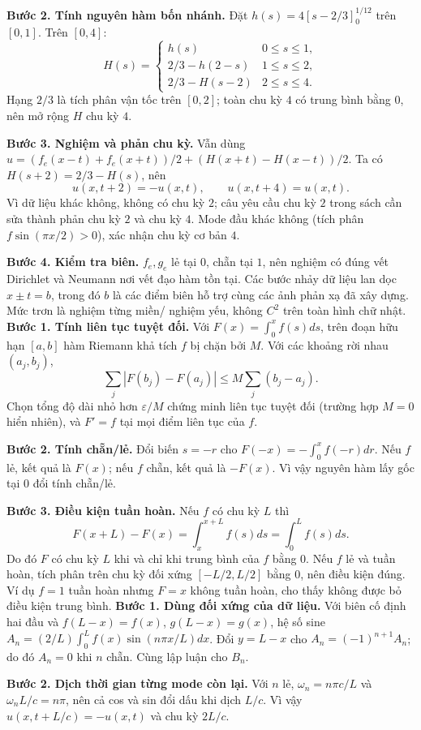 \textbf{Bước 2. Tính nguyên hàm bốn nhánh.} Đặt $h(s)=4[s-2/3]_0^{1/12}$ trên $[0,1]$. Trên $[0,4]$:
\[H(s)=\begin{cases}h(s)&0\le s\le1,\\2/3-h(2-s)&1\le s\le2,\\2/3-H(s-2)&2\le s\le4.\end{cases}\]
Hạng $2/3$ là tích phân vận tốc trên $[0,2]$; toàn chu kỳ $4$ có trung bình bằng $0$, nên mở rộng $H$ chu kỳ $4$.

\textbf{Bước 3. Nghiệm và phản chu kỳ.} Vẫn dùng $u=(f_e(x-t)+f_e(x+t))/2+(H(x+t)-H(x-t))/2$. Ta có $H(s+2)=2/3-H(s)$, nên
\[u(x,t+2)=-u(x,t),\qquad u(x,t+4)=u(x,t).\]
Vì dữ liệu khác không, không có chu kỳ $2$; câu yêu cầu chu kỳ $2$ trong sách cần sửa thành phản chu kỳ $2$ và chu kỳ $4$. Mode đầu khác không (tích phân $f\sin(\pi x/2)>0$), xác nhận chu kỳ cơ bản $4$.

\textbf{Bước 4. Kiểm tra biên.} $f_e,g_e$ lẻ tại $0$, chẵn tại $1$, nên nghiệm có đúng vết Dirichlet và Neumann nơi vết đạo hàm tồn tại. Các bước nhảy dữ liệu lan dọc $x\pm t=b$, trong đó $b$ là các điểm biên hỗ trợ cùng các ảnh phản xạ đã xây dựng. Mức trơn là nghiệm từng miền/ nghiệm yếu, không $C^2$ trên toàn hình chữ nhật.
\textbf{Bước 1. Tính liên tục tuyệt đối.} Với $F(x)=\int_0^xf(s)ds$, trên đoạn hữu hạn $[a,b]$ hàm Riemann khả tích $f$ bị chặn bởi $M$. Với các khoảng rời nhau $(a_j,b_j)$,
\[\sum_j|F(b_j)-F(a_j)|\le M\sum_j(b_j-a_j).\]
Chọn tổng độ dài nhỏ hơn $\varepsilon/M$ chứng minh liên tục tuyệt đối (trường hợp $M=0$ hiển nhiên), và $F'=f$ tại mọi điểm liên tục của $f$.

\textbf{Bước 2. Tính chẵn/lẻ.} Đổi biến $s=-r$ cho $F(-x)=-\int_0^xf(-r)dr$. Nếu $f$ lẻ, kết quả là $F(x)$; nếu $f$ chẵn, kết quả là $-F(x)$. Vì vậy nguyên hàm lấy gốc tại $0$ đổi tính chẵn/lẻ.

\textbf{Bước 3. Điều kiện tuần hoàn.} Nếu $f$ có chu kỳ $L$ thì
\[F(x+L)-F(x)=\int_x^{x+L}f(s)ds=\int_0^Lf(s)ds.\]
Do đó $F$ có chu kỳ $L$ khi và chỉ khi trung bình của $f$ bằng $0$. Nếu $f$ lẻ và tuần hoàn, tích phân trên chu kỳ đối xứng $[-L/2,L/2]$ bằng $0$, nên điều kiện đúng. Ví dụ $f=1$ tuần hoàn nhưng $F=x$ không tuần hoàn, cho thấy không được bỏ điều kiện trung bình.
\textbf{Bước 1. Dùng đối xứng của dữ liệu.} Với biên cố định hai đầu và $f(L-x)=f(x)$, $g(L-x)=g(x)$, hệ số sine $A_n=(2/L)\int_0^Lf(x)\sin(n\pi x/L)dx$. Đổi $y=L-x$ cho $A_n=(-1)^{n+1}A_n$; do đó $A_n=0$ khi $n$ chẵn. Cùng lập luận cho $B_n$.

\textbf{Bước 2. Dịch thời gian từng mode còn lại.} Với $n$ lẻ, $\omega_n=n\pi c/L$ và $\omega_nL/c=n\pi$, nên cả cos và sin đổi dấu khi dịch $L/c$. Vì vậy $u(x,t+L/c)=-u(x,t)$ và chu kỳ $2L/c$.

